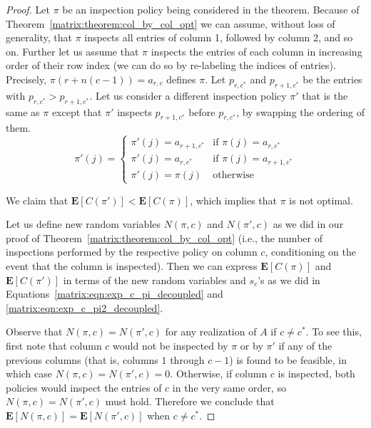  \begin{proof}
 	Let $\pi$ be an inspection policy being considered in the theorem.
 	Because of Theorem~\ref{matrix:theorem:col_by_col_opt} we can assume, without loss of generality, that $\pi$ inspects all entries of column 1, followed by column 2, and so on.
 	Further let us assume that $\pi$ inspects the entries of each column in increasing order of their row index (we can do so by re-labeling the indices of entries). Precisely, $\pi(r + n (c-1)) = a_{r,c}$ defines $\pi$. Let $p_{r,c^*}$ and $p_{r+1,c^*}$ be the entries with $p_{r,c^*} > p_{r+1, c^*}$.
 	Let us consider a different inspection policy $\pi'$ that is the same as $\pi$ except that $\pi'$ inspects $p_{r+1,c^*}$ before $p_{r,c^*}$, by swapping the ordering of them.
 	\begin{equation*}
 		\pi'(j) = 
 		\begin{cases}
 			\pi'(j) = a_{r+1,c^*}  &  \mbox{if~} \pi(j) = a_{r,c^*} \\
 			\pi'(j) = a_{r,c^*}    &  \mbox{if~} \pi(j) = a_{r+1,c^*} \\
 			\pi'(j) = \pi(j)     &  \mbox{otherwise} 
 		\end{cases}
 	\end{equation*}	
	
 	We claim that $\mathbf{E}[C(\pi')] < \mathbf{E}[C(\pi)]$, which implies that $\pi$ is not optimal.
	
 	Let us define new random variables $N(\pi, c)$ and $N(\pi', c)$ as we did in our proof of Theorem~\ref{matrix:theorem:col_by_col_opt} (i.e., the number of inspections performed by the respective policy on column $c$, conditioning on the event that the column is inspected).
 	Then we can express $\mathbf{E}[C(\pi)]$ and $\mathbf{E}[C(\pi')]$ in terms of the new random variables and $s_c$'s as we did in Equations~\ref{matrix:eqn:exp_c_pi_decoupled} and \ref{matrix:eqn:exp_c_pi2_decoupled}.
	
 	Observe that $N(\pi, c) = N(\pi', c)$ for any realization of $A$ if $c \neq c^*$.
 	To see this, first note that column $c$ would not be inspected by $\pi$ or by $\pi'$ if any of the previous columns (that is, columns $1$ through $c-1$) is found to be feasible, in which case $N(\pi, c) = N(\pi', c) = 0$. Otherwise, if column $c$ is inspected, both policies would inspect the entries of $c$ in the very same order, so $N(\pi, c) = N(\pi', c)$ must hold. Therefore we conclude that $\mathbf{E}[N(\pi, c)] = \mathbf{E}[N(\pi', c)]$ when $c \neq c^*$. 
	

\end{proof}
